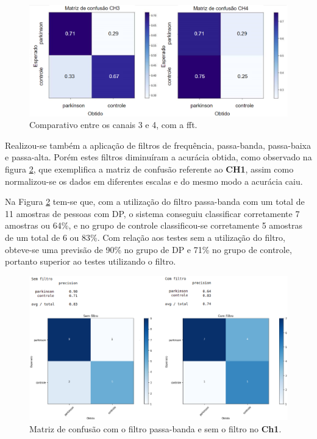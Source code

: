 \begin{figure}[!t]
    \centering
    \includegraphics[width=1.1\textwidth]{figuras/3e4.eps}
    \caption{Comparativo entre os canais 3 e 4, com a fft.}
    \label{fcomparativo3}
\end{figure}


Realizou-se também a aplicação de filtros de frequência, passa-banda, passa-baixa e passa-alta. Porém estes filtros diminuíram a acurácia obtida, como observado na figura \ref{comesemfiltro}, que exemplifica a matriz de confusão referente ao \textbf{CH1}, assim como normalizou-se os dados em diferentes escalas e do mesmo modo a acurácia caiu. 

Na Figura \ref{comesemfiltro} tem-se que, com a utilização do filtro passa-banda com um total de 11 amostras de pessoas com DP, o sistema conseguiu classificar corretamente 7 amostras ou 64\%, e no grupo de controle classificou-se corretamente 5 amostras de um total de 6 ou 83\%. Com relação aos testes sem a utilização do filtro, obteve-se uma previsão de 90\% no grupo de DP e 71\% no grupo de controle, portanto superior ao testes utilizando o filtro.


\begin{figure}[t]
    \centering
    \includegraphics[width=1\textwidth]{figuras/filtroComp.eps}
    \caption{Matriz de confusão com o filtro passa-banda e sem o filtro no \textbf{Ch1}.}
    \label{comesemfiltro}
\end{figure}

